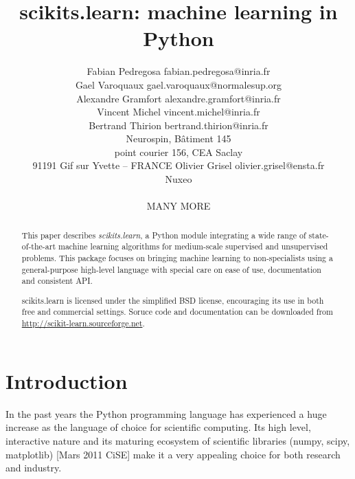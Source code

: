 \documentclass[twoside,11pt]{article}
\begin{document}
\title{scikits.learn: machine learning in Python}


\author{\name Fabian Pedregosa \email fabian.pedregosa@inria.fr \\
        \name Gael Varoquaux \email gael.varoquaux@normalesup.org  \\
        \name Alexandre Gramfort \email alexandre.gramfort@inria.fr \\
        \name Vincent Michel  \email vincent.michel@inria.fr \\
        \name Bertrand Thirion  \email bertrand.thirion@inria.fr \\
        \addr  Neurospin, B\^atiment 145\\
        point courier 156, CEA Saclay\\
        91191 Gif sur Yvette – FRANCE
        \AND
        \name Olivier Grisel \email olivier.grisel@ensta.fr \\
        \addr Nuxeo \\
        \\
        \AND
        \name MANY MORE
}



\maketitle

\begin{abstract}
This paper describes \emph{scikits.learn}, a Python module integrating
a wide range of state-of-the-art machine learning algorithms for
medium-scale supervised and unsupervised problems. This package
focuses on bringing machine learning to non-specialists using a
general-purpose high-level language with special care on ease of use,
documentation and consistent API.


scikits.learn is licensed under the simplified BSD license,
encouraging its use in both free and commercial settings. Soruce code
and documentation can be downloaded from
\url{http://scikit-learn.sourceforge.net}.

\end{abstract}





\section{Introduction}
In the past years the Python programming language has experienced a
huge increase as the language of choice for scientific computing. Its
high level, interactive nature and its maturing ecosystem of
scientific libraries (numpy, scipy, matplotlib) [Mars 2011 CiSE]
make it a very appealing choice for both research and industry.
\end{document}

